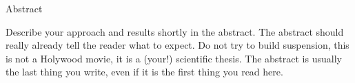 \documentclass[main.tex]{subfiles}
\begin{document}
\begin{center}
    \large{Abstract}
\end{center}
\thispagestyle{empty}

Describe your approach and results shortly in the abstract.
The abstract should really already tell the reader what to expect.
Do not try to  build suspension, this is not a Holywood  movie, it is a
(your!) scientific thesis.  The abstract is usually the last thing you
write, even if it is the first thing you read here.
\end{document}
